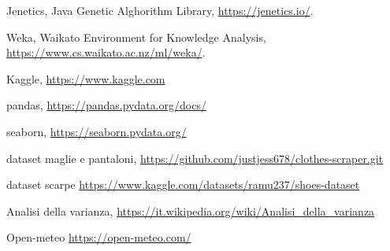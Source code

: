 \documentclass[a4paper, 11pt, oneside]{report}
\begin{document}
    \begin{thebibliography}{9} %
        Jenetics, Java Genetic Alghorithm Library,
        \url{https://jenetics.io/}.

        Weka, Waikato Environment for Knowledge Analysis,
        \url{https://www.cs.waikato.ac.nz/ml/weka/}.

        Kaggle,
        \url{https://www.kaggle.com}

        pandas,
        \url{https://pandas.pydata.org/docs/}

        seaborn,
        \url{https://seaborn.pydata.org/}

        dataset maglie e pantaloni,
        \url{https://github.com/justjess678/clothes-scraper.git}

        dataset scarpe
        \url{https://www.kaggle.com/datasets/ramu237/shoes-dataset}

        Analisi della varianza,
        \url{https://it.wikipedia.org/wiki/Analisi_della_varianza}

        Open-meteo
        \url{https://open-meteo.com/}
    \end{thebibliography}
\end{document}
